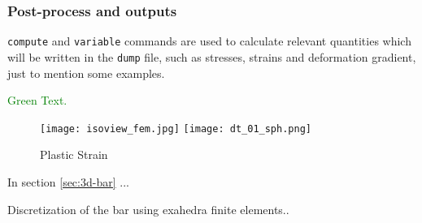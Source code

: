\documentclass[11pt]{scrartcl}
\begin{document}
\subsubsection{Post-process and outputs}
\texttt{compute} and \texttt{variable} commands are used to calculate relevant quantities which will
be written in the \texttt{dump} file, such as stresses, strains and deformation gradient, just to
mention some examples.

\textcolor{green}{Green Text.}
\color{black}

\begin{figure}
  \begin{center}
    \texttt{[image: isoview\_fem.jpg]}
    \texttt{[image: dt\_01\_sph.png]}
  \caption{Plastic Strain}
  \label{fig:plast-strain}
  \end{center}
\end{figure}

\newpage

In section \ref{sec:3d-bar} ...

Discretization of the bar using exahedra finite elements..
\end{document}
